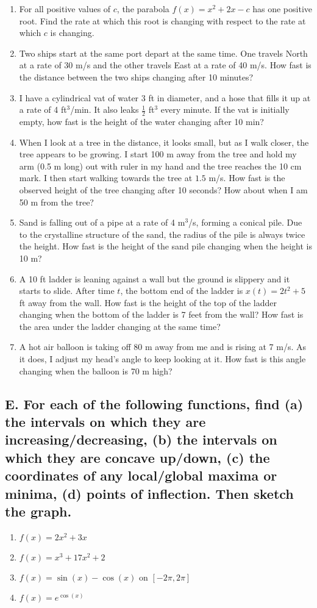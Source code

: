 \documentclass{article}
\begin{document}
\begin{enumerate}
\item For all positive values of $c$, the parabola $f(x)=x^2+2x-c$ has one positive root. Find the rate at which this root is changing with respect to the rate at which $c$ is changing.
\item Two ships start at the same port depart at the same time. One travels North at a rate of 30 m/s and the other travels East at a rate of 40 m/s. How fast is the distance between the two ships changing after 10 minutes?
\item I have a cylindrical vat of water 3 ft in diameter, and a hose that fills it up at a rate of 4 ft$^3$/min. It also leaks $\frac{1}{2}$ ft$^3$ every minute. If the vat is initially empty, how fast is the height of the water changing after 10 min?
\item When I look at a tree in the distance, it looks small, but as I walk closer, the tree appears to be growing. I start 100 m away from the tree and hold my arm (0.5 m long) out with ruler in my hand and the tree reaches the 10 cm mark. I then start walking towards the tree at $1.5$ m/s. How fast is the observed height of the tree changing after 10 seconds? How about when I am 50 m from the tree?
\item Sand is falling out of a pipe at a rate of 4 m$^3$/s, forming a conical pile. Due to the crystalline structure of the sand, the radius of the pile is always twice the height. How fast is the height of the sand pile changing when the height is 10 m?
\item A 10 ft ladder is leaning against a wall but the ground is slippery and it starts to slide. After time $t$, the bottom end of the ladder is $x(t)=2t^2 + 5$ ft away from the wall. How fast is the height of the top of the ladder changing when the bottom of the ladder is 7 feet from the wall? How fast is the area under the ladder changing at the same time?
\item A hot air balloon is taking off 80 m away from me and is rising at 7 m/s. As it does, I adjust my head's angle to keep looking at it. How fast is this angle changing when the balloon is 70 m high?
\end{enumerate}



\subsection*{E. For each of the following functions, find (a) the intervals on which they are increasing/decreasing, (b) the intervals on which they are concave up/down, (c) the coordinates of any local/global maxima or minima, (d) points of inflection. Then sketch the graph.}
\begin{multicols}{2}
\begin{enumerate}
\item $f(x)=2x^2+3x$
\item $f(x)=x^3+17x^2+2$
\item $f(x)=\sin(x) - \cos(x)$ on $[-2\pi,2\pi]$
\item $f(x)=e^{\cos(x)}$
\end{enumerate}
\end{multicols}
\end{document}
